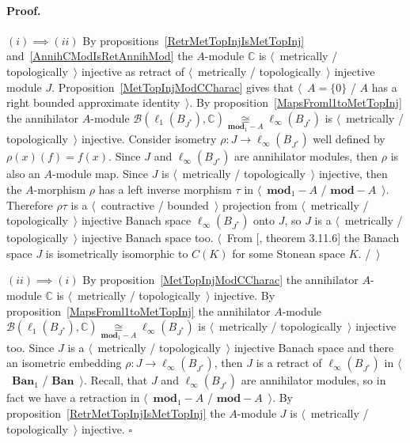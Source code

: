\documentclass[12pt]{article}
\newcommand{\isom}[1]{\mathop{\mathbin{\cong}}\limits_{#1}}
\renewenvironment{proof}{\paragraph{Proof.}}{\hfill$\square$\medskip}
\begin{document}
\begin{proof} $(i) \implies (ii)$  By
    propositions~\ref{RetrMetTopInjIsMetTopInj} and~\ref{AnnihCModIsRetAnnihMod}
    the $A$-module $\mathbb{C}$ is $\langle$~metrically /
    topologically~$\rangle$ injective as retract of $\langle$~metrically /
    topologically~$\rangle$ injective module $J$.
    Proposition~\ref{MetTopInjModCCharac} gives that $\langle$~$A=\{0\}$ / $A$
    has a right bounded approximate identity~$\rangle$. By
    proposition~\ref{MapsFroml1toMetTopInj} the annihilator $A$-module
    $\mathcal{B}(\ell_1(B_{J^*}),\mathbb{C})
        \isom{\mathbf{mod}_1-A}
        \ell_\infty(B_{J^*})$ is $\langle$~metrically / topologically~$\rangle$
    injective. Consider isometry $\rho:J\to\ell_\infty(B_{J^*})$ well defined by
    $\rho(x)(f)=f(x)$. Since $J$ and $\ell_\infty(B_{J^*})$ are annihilator
    modules, then $\rho$ is also an $A$-module map. Since $J$ is
    $\langle$~metrically / topologically~$\rangle$ injective, then the
    $A$-morphism $\rho$ has a left inverse morphism $\tau$ in
    $\langle$~$\mathbf{mod}_1-A$ / $\mathbf{mod}-A$~$\rangle$. Therefore $\rho\tau$ is a
    $\langle$~contractive / bounded~$\rangle$ projection from
    $\langle$~metrically / topologically~$\rangle$ injective Banach space
    $\ell_\infty(B_{J^*})$ onto $J$, so $J$ is a $\langle$~metrically /
    topologically~$\rangle$ injective Banach space too. $\langle$~From
    [\cite{LaceyIsomThOfClassicBanSp}, theorem 3.11.6] the Banach space $J$ is
    isometrically isomorphic to $C(K)$ for some Stonean space $K$. /~$\rangle$

    $(ii)\implies(i)$ By proposition~\ref{MetTopInjModCCharac} the annihilator
    $A$-module $\mathbb{C}$ is $\langle$~metrically / topologically~$\rangle$
    injective. By proposition~\ref{MapsFroml1toMetTopInj} the annihilator
    $A$-module $\mathcal{B}(\ell_1(B_{J^*}),\mathbb{C})
        \isom{\mathbf{mod}_1-A}
        \ell_\infty(B_{J^*})$ is $\langle$~metrically / topologically~$\rangle$
    injective too. Since $J$ is a $\langle$~metrically / topologically~$\rangle$
    injective Banach space and there an isometric embedding $\rho:J\to
        \ell_\infty(B_{J^*})$, then $J$ is a retract of $\ell_\infty(B_{J^*})$ in
    $\langle$~$\mathbf{Ban}_1$ / $\mathbf{Ban}$~$\rangle$. Recall, that $J$ and
    $\ell_\infty(B_{J^*})$ are annihilator modules, so in fact we have a
    retraction in $\langle$~$\mathbf{mod}_1-A$ / $\mathbf{mod}-A$~$\rangle$. By
    proposition~\ref{RetrMetTopInjIsMetTopInj} the $A$-module $J$ is
    $\langle$~metrically / topologically~$\rangle$ injective.
\end{proof}
\end{document}
